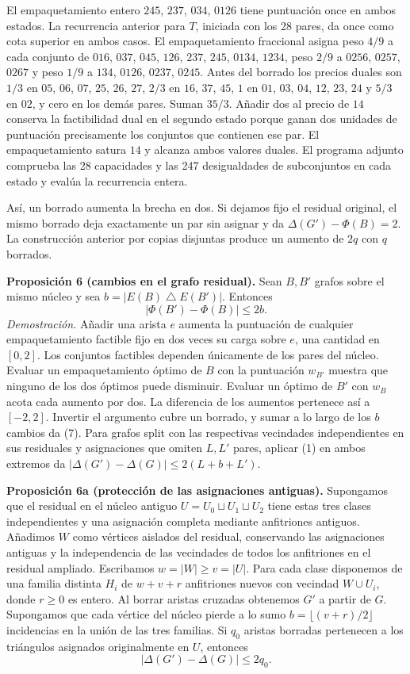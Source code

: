 \documentclass[spanish,11pt,a4paper]{article}
\begin{document}
El empaquetamiento entero \(245\), \(237\), \(034\), \(0126\) tiene puntuación once en ambos estados. La recurrencia anterior para \(T\), iniciada con los 28 pares, da once como cota superior en ambos casos. El empaquetamiento fraccional asigna peso \(4/9\) a cada conjunto de \(016\), \(037\), \(045\), \(126\), \(237\), \(245\), \(0134\), \(1234\), peso \(2/9\) a \(0256\), \(0257\), \(0267\) y peso \(1/9\) a \(134\), \(0126\), \(0237\), \(0245\). Antes del borrado los precios duales son \(1/3\) en \(05\), \(06\), \(07\), \(25\), \(26\), \(27\), \(2/3\) en \(16\), \(37\), \(45\), \(1\) en \(01\), \(03\), \(04\), \(12\), \(23\), \(24\) y \(5/3\) en \(02\), y cero en los demás pares. Suman \(35/3\). Añadir dos al precio de \(14\) conserva la factibilidad dual en el segundo estado porque ganan dos unidades de puntuación precisamente los conjuntos que contienen ese par. El empaquetamiento satura \(14\) y alcanza ambos valores duales. El programa adjunto comprueba las 28 capacidades y las 247 desigualdades de subconjuntos en cada estado y evalúa la recurrencia entera.

Así, un borrado aumenta la brecha en dos. Si dejamos fijo el residual original, el mismo borrado deja exactamente un par sin asignar y da \(\Delta(G')-\Phi(B)=2\). La construcción anterior por copias disjuntas produce un aumento de \(2q\) con \(q\) borrados.

\textbf{Proposición 6 (cambios en el grafo residual).} Sean \(B,B'\) grafos sobre el mismo núcleo y sea \(b=|E(B)\mathbin{\triangle} E(B')|\). Entonces \[
|\Phi(B')-\Phi(B)|\le 2b. \tag{7}
\] \emph{Demostración.} Añadir una arista \(e\) aumenta la puntuación de cualquier empaquetamiento factible fijo en dos veces su carga sobre \(e\), una cantidad en \([0,2]\). Los conjuntos factibles dependen únicamente de los pares del núcleo. Evaluar un empaquetamiento óptimo de \(B\) con la puntuación \(w_{B'}\) muestra que ninguno de los dos óptimos puede disminuir. Evaluar un óptimo de \(B'\) con \(w_B\) acota cada aumento por dos. La diferencia de los aumentos pertenece así a \([-2,2]\). Invertir el argumento cubre un borrado, y sumar a lo largo de los \(b\) cambios da (7). Para grafos split con las respectivas vecindades independientes en sus residuales y asignaciones que omiten \(L,L'\) pares, aplicar (1) en ambos extremos da \(|\Delta(G')-\Delta(G)|\le 2(L+b+L')\).

\textbf{Proposición 6a (protección de las asignaciones antiguas).} Supongamos que el residual en el núcleo antiguo \(U=U_0\sqcup U_1\sqcup U_2\) tiene estas tres clases independientes y una asignación completa mediante anfitriones antiguos. Añadimos \(W\) como vértices aislados del residual, conservando las asignaciones antiguas y la independencia de las vecindades de todos los anfitriones en el residual ampliado. Escribamos \(w=|W|\ge v=|U|\). Para cada clase disponemos de una familia distinta \(H_i\) de \(w+v+r\) anfitriones nuevos con vecindad \(W\cup U_i\), donde \(r\ge0\) es entero. Al borrar aristas cruzadas obtenemos \(G'\) a partir de \(G\). Supongamos que cada vértice del núcleo pierde a lo sumo \(b=\lfloor(v+r)/2\rfloor\) incidencias en la unión de las tres familias. Si \(q_0\) aristas borradas pertenecen a los triángulos asignados originalmente en \(U\), entonces \[
|\Delta(G')-\Delta(G)|\le 2q_0.
\]
\end{document}
